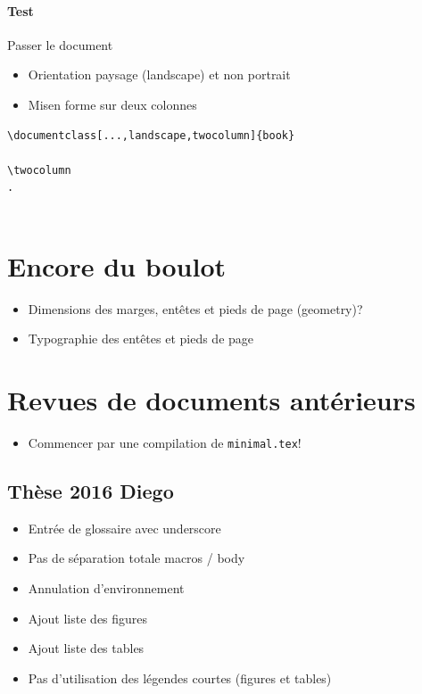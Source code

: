 \paragraph{Test}

Passer le document

\begin{itemize}
\item Orientation paysage (landscape) et non portrait
\item Misen forme sur deux colonnes
\end{itemize}

\begin{verbatim}
\documentclass[...,landscape,twocolumn]{book}

\twocolumn
.


\end{verbatim}


\clearpage{}



\section{Encore du boulot}

\begin{itemize}
\item Dimensions des marges, entêtes et pieds de page (geometry)?
\item Typographie des entêtes et pieds de page
\end{itemize}

\section{Revues de documents antérieurs}

\begin{itemize}
\item Commencer par une compilation de \texttt{minimal.tex}!
\end{itemize}

\subsection{Thèse 2016 Diego}

\begin{itemize}
\item Entrée de glossaire avec underscore
\item Pas de séparation totale macros / body
\item Annulation d'environnement
\item Ajout liste des figures
\item Ajout liste des tables
\item Pas d'utilisation des légendes courtes (figures et tables)
\end{itemize}


